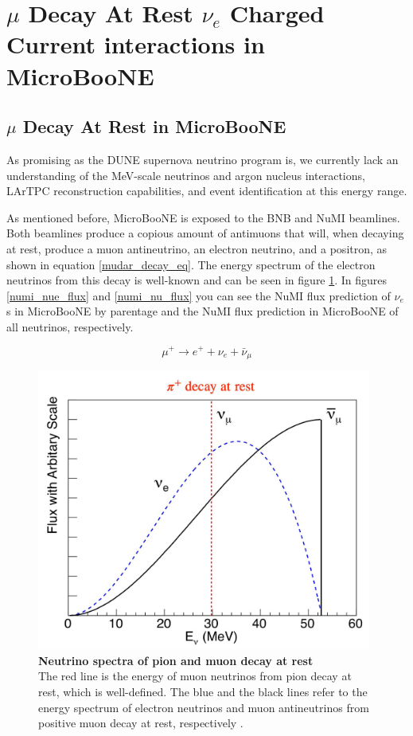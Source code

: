 \section{$\mu$ Decay At Rest $\nu_e$ Charged Current interactions in MicroBooNE}

\subsection{$\mu$ Decay At Rest in MicroBooNE}
As promising as the DUNE supernova neutrino program is, we currently lack an understanding of the MeV-scale neutrinos and argon nucleus interactions, LArTPC reconstruction capabilities, and event identification at this energy range. 

As mentioned before, MicroBooNE is exposed to the BNB and NuMI beamlines. Both beamlines produce a copious amount of antimuons that will, when decaying at rest, produce a muon antineutrino, an electron neutrino, and a positron, as shown in equation \ref{mudar_decay_eq}. The energy spectrum of the electron neutrinos from this decay is well-known and can be seen in figure \ref{mudar_nue_energy}. In figures \ref{numi_nue_flux} and \ref{numi_nu_flux} you can see the NuMI flux prediction of $\nu_e$s in MicroBooNE by parentage and the NuMI flux prediction in MicroBooNE of all neutrinos, respectively. 

\begin{equation}
	\mu^{+} \longrightarrow e^{+} + \nu_e + \bar{\nu}_{\mu}
    \label{mudar_decay_eq}
\end{equation}

\begin{figure}[h!]
    \centering
    \includegraphics[width=110mm]{Figures/mudar_nue_energy.jpg}
    \caption[Neutrino spectra of pion and muon decay at rest]{{\textbf{Neutrino spectra of pion and muon decay at rest}}\\ The red line is the energy of muon neutrinos from pion decay at rest, which is well-defined. The blue and the black lines refer to the energy spectrum of electron neutrinos and muon antineutrinos from positive muon decay at rest, respectively \cite{Yang2012}.}
    \label{mudar_nue_energy}
\end{figure}

